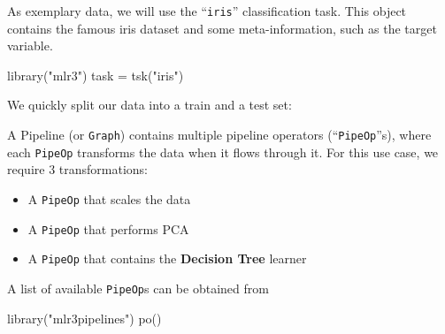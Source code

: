 \documentclass[
]{scrbook}
\newenvironment{Shaded}{\begin{snugshade}}{\end{snugshade}}
\newcommand{\CommentTok}[1]{\textcolor[rgb]{0.56,0.35,0.01}{\textit{#1}}}
\newcommand{\DecValTok}[1]{\textcolor[rgb]{0.00,0.00,0.81}{#1}}
\newcommand{\FunctionTok}[1]{\textcolor[rgb]{0.00,0.00,0.00}{#1}}
\newcommand{\NormalTok}[1]{#1}
\newcommand{\OtherTok}[1]{\textcolor[rgb]{0.56,0.35,0.01}{#1}}
\newcommand{\SpecialCharTok}[1]{\textcolor[rgb]{0.00,0.00,0.00}{#1}}
\newcommand{\StringTok}[1]{\textcolor[rgb]{0.31,0.60,0.02}{#1}}
\providecommand{\tightlist}{%
  \setlength{\itemsep}{0pt}\setlength{\parskip}{0pt}}
\renewenvironment{Shaded} {\begin{snugshade}\small} {\end{snugshade}}
\begin{document}
As exemplary data, we will use the ``\texttt{iris}'' classification task.
This object contains the famous iris dataset and some meta-information, such as the target variable.

\begin{Shaded}
\begin{Highlighting}[]
\FunctionTok{library}\NormalTok{(}\StringTok{"mlr3"}\NormalTok{)}
\NormalTok{task }\OtherTok{=} \FunctionTok{tsk}\NormalTok{(}\StringTok{"iris"}\NormalTok{)}
\end{Highlighting}
\end{Shaded}

We quickly split our data into a train and a test set:

\begin{Shaded}
\end{Shaded}

A Pipeline (or \texttt{Graph}) contains multiple pipeline operators (``\texttt{PipeOp}''s), where each \texttt{PipeOp} transforms the data when it flows through it.
For this use case, we require 3 transformations:

\begin{itemize}
\tightlist
\item
  A \texttt{PipeOp} that scales the data
\item
  A \texttt{PipeOp} that performs PCA
\item
  A \texttt{PipeOp} that contains the \textbf{Decision Tree} learner
\end{itemize}

A list of available \texttt{PipeOp}s can be obtained from

\begin{Shaded}
\begin{Highlighting}[]
\FunctionTok{library}\NormalTok{(}\StringTok{"mlr3pipelines"}\NormalTok{)}
\FunctionTok{po}\NormalTok{()}
\end{Highlighting}
\end{Shaded}
\end{document}
